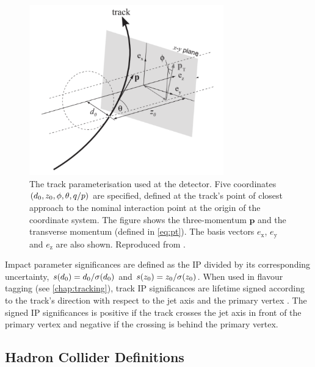 \begin{figure}[!htbp]
  \centering
  \includegraphics[width=0.75\textwidth]{chapters/2.detector/figs/track_params.pdf}
  \caption{
    The track parameterisation used at the \ATLAS detector.
    Five coordinates $(d_{0}, z_{0}, \phi, \theta, q/p)$ are specified, defined at the track's point of closest approach to the nominal interaction point at the origin of the coordinate system.
    The figure shows the three-momentum $\mathbf{p}$ and the transverse momentum \pt (defined in \cref{eq:pt}).
    The basis vectors $e_{\mathrm{x}}$, $e_{\mathrm{y}}$ and $e_{\mathrm{z}}$ are also shown.
    Reproduced from .
  }
  \label{fig:track_params}
\end{figure}

Impact parameter significances are defined as the IP divided by its corresponding uncertainty, $s(d_0) = d_0 / \sigma(d_0)$ and $s(z_0) = z_0 / \sigma(z_0)$.
When used in flavour tagging (see \cref{chap:tracking}), track IP significances are lifetime signed according to the track's direction with respect to the jet axis and the primary vertex \cite{PERF-2012-04}.
The signed IP significances is positive if the track crosses the jet axis in front of the primary vertex and negative if the crossing is behind the primary vertex.


\subsection{Hadron Collider Definitions}\label{sec:collider_defs}

